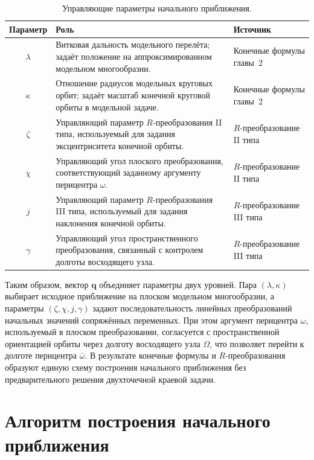 \begin{table}[htbp]
	\centering
	\caption{Управляющие параметры начального приближения.}
	\label{tab:chap4_control_parameters}
	\begin{tabular}{cp{}p{}}
		\toprule
		Параметр & Роль & Источник \\
		\midrule
		\(\lambda\) &
		Витковая дальность модельного перелёта; задаёт положение на аппроксимированном модельном многообразии. &
		Конечные формулы главы~2 \\
		\(\kappa\) &
		Отношение радиусов модельных круговых орбит; задаёт масштаб конечной круговой орбиты в модельной задаче. &
		Конечные формулы главы~2 \\
		\(\zeta\) &
		Управляющий параметр \(R\)-преобразования II типа, используемый для задания эксцентриситета конечной орбиты. &
		\(R\)-преобразование II типа \\
		\(\chi\) &
		Управляющий угол плоского преобразования, соответствующий заданному аргументу перицентра \(\omega\). &
		\(R\)-преобразование II типа \\
		\(j\) &
		Управляющий параметр \(R\)-преобразования III типа, используемый для задания наклонения конечной орбиты. &
		\(R\)-преобразование III типа \\
		\(\gamma\) &
		Управляющий угол пространственного преобразования, связанный с контролем долготы восходящего узла. &
		\(R\)-преобразование III типа \\
		\bottomrule
	\end{tabular}
\end{table}

Таким образом, вектор \(\mathbf q\) объединяет параметры двух уровней. Пара \((\lambda,\kappa)\) выбирает исходное приближение на плоском модельном многообразии, а параметры \((\zeta,\chi,j,\gamma)\) задают последовательность линейных преобразований начальных значений сопряжённых переменных. При этом аргумент перицентра \(\omega\), используемый в плоском преобразовании, согласуется с пространственной ориентацией орбиты через долготу восходящего узла \(\Omega\), что позволяет перейти к долготе перицентра \(\bar{\omega}\). В результате конечные формулы и \(R\)-преобразования образуют единую схему построения начального приближения без предварительного решения двухточечной краевой задачи.

\section{Алгоритм построения начального приближения}


